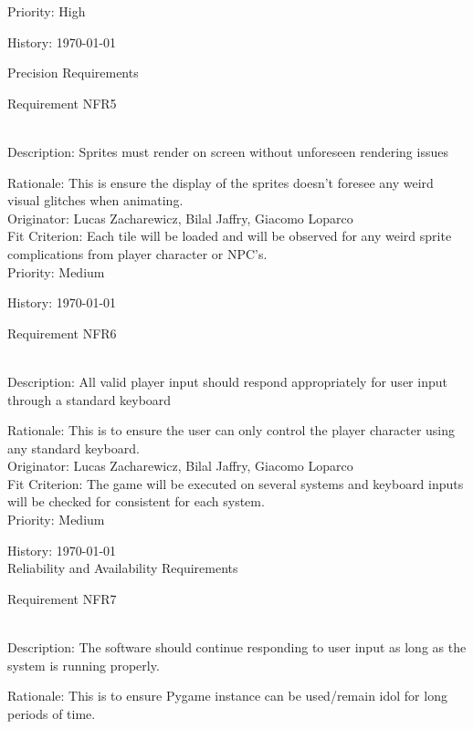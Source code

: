 \documentclass[12pt, titlepage]{article}
\begin{document}
\begin{enumerate}
{\color{blue}Priority: High}
  
{\color{blue}History: \today}

Precision Requirements

{\color{blue}\item Requirement NFR5}\\
{\color{blue} Description:} Sprites must render on screen without unforeseen rendering issues

{\color{blue}Rationale: This is ensure the display of the sprites doesn't foresee any weird visual glitches when animating. }\\

{\color{blue}Originator: Lucas Zacharewicz, Bilal Jaffry, Giacomo Loparco}\\

{\color{blue}Fit Criterion: Each tile will be loaded and will be observed for any weird sprite complications from player character or NPC's.}\\
 
{\color{blue}Priority: Medium}
  
{\color{blue}History: \today}

{\color{blue}\item Requirement NFR6}\\
{\color{blue} Description:} All valid player input should respond appropriately for user input through a standard keyboard

{\color{blue}Rationale: This is to ensure the user can only control the player character using any standard keyboard. }\\

{\color{blue}Originator: Lucas Zacharewicz, Bilal Jaffry, Giacomo Loparco}\\

{\color{blue}Fit Criterion: The game will be executed on several systems and keyboard inputs will be checked for consistent for each system.}\\
 
{\color{blue}Priority: Medium}
  
{\color{blue}History: \today}\\
\newpage
Reliability and Availability Requirements

{\color{blue}\item Requirement NFR7}\\
{\color{blue} Description:} The software should continue responding to user input as long as the system is running properly.

{\color{blue}Rationale: This is to ensure Pygame instance can be used/remain idol for long periods of time.}\\


\end{enumerate}
\end{document}
